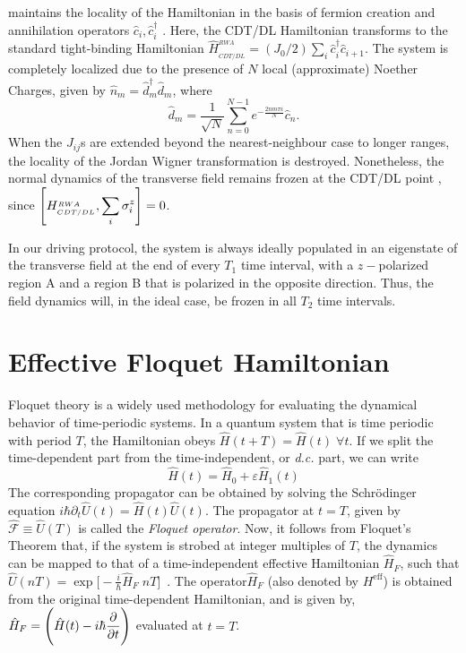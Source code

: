 \documentclass[12pt]{iopart}
\begin{document}
maintains the locality of the Hamiltonian in the basis of fermion creation and annihilation operators $\hat{c}^{\;}_i, \hat{c}^\dagger_i$ \cite{Lieb1961, mbeng2020}. Here, the CDT/DL Hamiltonian transforms to the standard tight-binding Hamiltonian $\hat{H}^{_{RWA}}_{_{CDT/DL}}=(J_0/2)\sum_i \hat{c}^\dagger_i \hat{c}^{\;}_{i+1}$. The system is completely localized due to the presence of $N$ local (approximate) Noether Charges, given by $\hat{n}_m= \hat{d}^{\dagger}_m\hat{d}^{\;}_m$, where
\begin{equation}
\hat{d}_m = \frac{1}{\sqrt{N}}\sum_{n=0}^{N-1}e^{-\frac{2nm\pi i}{N}}\hat{c}_n.
\end{equation}
When the $J_{ij}$s are extended beyond the nearest-neighbour case to longer ranges, the locality of the Jordan Wigner transformation is destroyed. Nonetheless, the normal dynamics of the transverse field remains frozen at the CDT/DL point , since $\comm{H^{_{RWA}}_{_{CDT/DL}}}{\displaystyle\sum_i\sigma^z_i}=0$.

In our driving protocol, the system is always ideally populated in an eigenstate of the transverse field at the end of every $T_1$ time interval, with a $z-$polarized region A and a region B that is polarized in the opposite direction. Thus, the field dynamics will, in the ideal case, be frozen in all $T_2$ time intervals.

\section{\label{sec:AppendixB} Effective Floquet Hamiltonian}

Floquet theory is a widely used methodology for evaluating the dynamical behavior of time-periodic systems.  In a quantum system that is time periodic with period $T$, the Hamiltonian obeys $\hat{H}(t+T) = \hat{H}(t)\;\forall t$. If we split the time-dependent part from the time-independent, or \textit{d.c.} part, we can write
\begin{equation*}
    \hat{H}(t) = \hat{H}_0 + \varepsilon \hat{H}_1(t)
\end{equation*}
The corresponding propagator can be obtained by solving the Schr\"odinger equation $\displaystyle{i\hbar \partial_t \hat{U}(t) = \hat{H}(t) \hat{U}(t)}$.  The propagator at $t=T$, given by $ \hat{\mathcal{F}}\equiv \hat{U}(T)$ is called the \textit{Floquet operator}. Now, it follows from Floquet's Theorem that, if the system is strobed at integer multiples of $T$, the dynamics can be mapped to that of a time-independent effective Hamiltonian $\hat{H}_F$, such that  $\displaystyle\hat{U}(nT) = \exp\bigg[-\frac{i}{\hbar}\hat{H}_F\; nT \bigg]$~\cite{Eckardt_2015}.  The operator$\hat{H}_F$ (also denoted by $H^\mathrm{eff}$) is obtained from the original time-dependent Hamiltonian, and is given by, $\displaystyle \hat{H}_F = \Bigg(\hat{H}(t) - i\hbar \pdv{t}\Bigg)$ evaluated at $t=T$. 
\end{document}
